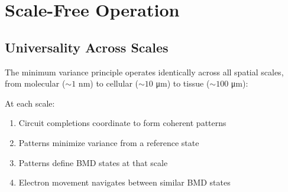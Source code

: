 \section{Scale-Free Operation}

\subsection{Universality Across Scales}

\begin{theorem}
\label{thm:scale_free}
The minimum variance principle operates identically across all spatial scales, from molecular ($\sim 1$ nm) to cellular ($\sim 10$ μm) to tissue ($\sim 100$ μm):

At each scale:
\begin{enumerate}
\item Circuit completions coordinate to form coherent patterns
\item Patterns minimize variance from a reference state
\item Patterns define BMD states at that scale
\item Electron movement navigates between similar BMD states
\end{enumerate}
\end{theorem}

